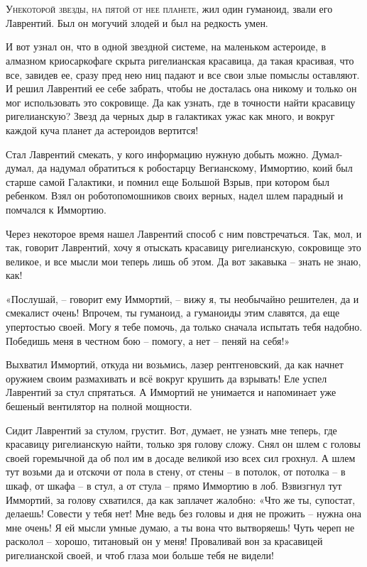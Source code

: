 \documentclass[ebook,oneside,final,openright]{memoir}
\begin{document}
\chapter{}
 \lettrine{У}{некоторой звезды, на пятой от нее планете,} жил один гуманоид, звали его Лаврентий. Был он могучий злодей и был на редкость умен.\par
\par
И вот узнал он, что в одной звездной системе, на маленьком астероиде, в алмазном криосаркофаге скрыта ригелианская красавица, да такая красивая, что все, завидев ее, сразу пред нею ниц падают и все свои злые помыслы оставляют. И решил Лаврентий ее себе забрать, чтобы не досталась она никому и только он мог использовать это сокровище. Да как узнать, где в точности найти красавицу ригелианскую? Звезд да черных дыр в галактиках ужас как много, и вокруг каждой куча планет да астероидов вертится!\par
\par
Стал Лаврентий смекать, у кого информацию нужную добыть можно. Думал-думал, да надумал обратиться к робостарцу Вегианскому, Иммортию, коий был старше самой Галактики, и помнил еще Большой Взрыв, при котором был ребенком. Взял он роботопомошников своих верных, надел шлем парадный и помчался к Иммортию.\par
\par
Через некоторое время нашел Лаврентий способ с ним повстречаться. Так, мол, и так, говорит Лаврентий, хочу я отыскать красавицу ригелианскую, сокровище это великое, и все мысли мои теперь лишь об этом. Да вот закавыка – знать не знаю, как!\par
\par
«Послушай, – говорит ему Иммортий, – вижу я, ты необычайно решителен, да и смекалист очень! Впрочем, ты гуманоид, а гуманоиды этим славятся, да еще упертостью своей. Могу я тебе помочь, да только сначала испытать тебя надобно. Победишь меня в честном бою – помогу, а нет – пеняй на себя!» \par
\par
Выхватил Иммортий, откуда ни возьмись, лазер рентгеновский, да как начнет оружием своим размахивать и всё вокруг крушить да взрывать! Еле успел Лаврентий за стул спрятаться. А Иммортий не унимается и напоминает уже бешеный вентилятор на полной мощности. \par
\par
Сидит Лаврентий за стулом, грустит. Вот, думает, не узнать мне теперь, где красавицу ригелианскую найти, только зря голову сложу. Снял он шлем с головы своей горемычной да об пол им в досаде великой изо всех сил грохнул. А шлем тут возьми да и отскочи от пола в стену, от стены – в потолок, от потолка – в шкаф, от шкафа – в стул, а от стула – прямо Иммортию в лоб. Взвизгнул тут Иммортий, за голову схватился, да как заплачет жалобно: «Что же ты, супостат, делаешь! Совести у тебя нет! Мне ведь без головы и дня не прожить – нужна она мне очень! Я ей мысли умные думаю, а ты вона что вытворяешь! Чуть череп не расколол – хорошо, титановый он у меня! Проваливай вон за красавицей ригелианской своей, и чтоб глаза мои больше тебя не видели!\par
\end{document}
